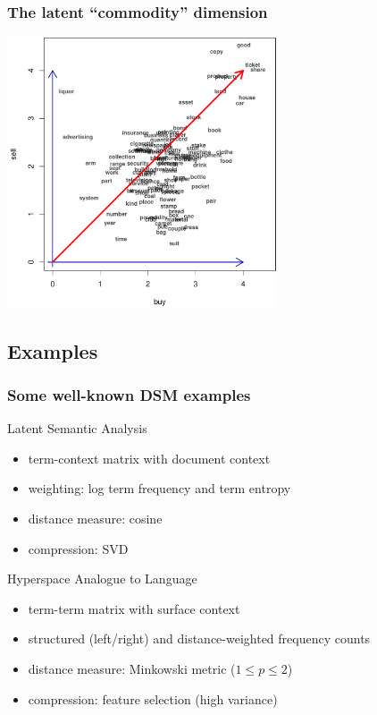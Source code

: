 \begin{frame}[c]
  \frametitle{The latent ``commodity'' dimension}
  \begin{center}
    \ungap[1]
    \includegraphics[width=8cm]{img/3_buy_sell_labels_latent}
  \end{center}
\end{frame}


\subsection{Examples}

\begin{frame}
  \frametitle{Some well-known DSM examples}

  \ungap
  \begin{block} {Latent Semantic Analysis \citep{Landauer:Dumais:97}}
  \begin{itemize}
  \item term-context matrix with document context
  \item weighting: log term frequency and term entropy
  \item distance measure: cosine
  \item compression: SVD
  \end{itemize}
  \end{block}
 
 \begin{block} {Hyperspace Analogue to Language \citep{Lund:Burgess:96}}
  \begin{itemize}
  \item term-term matrix with surface context
  \item structured (left/right) and distance-weighted frequency counts
  \item distance measure: Minkowski metric ($1\leq p \leq 2$)
  \item compression: feature selection (high variance)
  \end{itemize}
  \end{block}
\end{frame}

